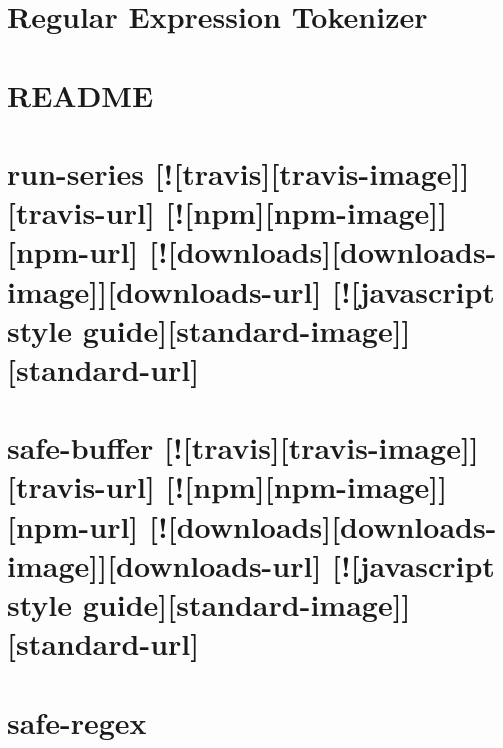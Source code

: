 \documentclass[twoside]{book}
\newcommand{\+}{\discretionary{\mbox{\scriptsize$\hookleftarrow$}}{}{}}
\begin{document}
\chapter{Regular Expression Tokenizer}
\label{md_dsmacc_vis_degree_node_modules_ret_README}

\chapter{R\+E\+A\+D\+ME}
\label{md_dsmacc_vis_degree_node_modules_rimraf_README}

\chapter{run-\/series \mbox{[}!\mbox{[}travis\mbox{]}\mbox{[}travis-\/image\mbox{]}\mbox{]}\mbox{[}travis-\/url\mbox{]} \mbox{[}!\mbox{[}npm\mbox{]}\mbox{[}npm-\/image\mbox{]}\mbox{]}\mbox{[}npm-\/url\mbox{]} \mbox{[}!\mbox{[}downloads\mbox{]}\mbox{[}downloads-\/image\mbox{]}\mbox{]}\mbox{[}downloads-\/url\mbox{]} \mbox{[}!\mbox{[}javascript style guide\mbox{]}\mbox{[}standard-\/image\mbox{]}\mbox{]}\mbox{[}standard-\/url\mbox{]}}
\label{md_dsmacc_vis_degree_node_modules_run-series_README}

\chapter{safe-\/buffer \mbox{[}!\mbox{[}travis\mbox{]}\mbox{[}travis-\/image\mbox{]}\mbox{]}\mbox{[}travis-\/url\mbox{]} \mbox{[}!\mbox{[}npm\mbox{]}\mbox{[}npm-\/image\mbox{]}\mbox{]}\mbox{[}npm-\/url\mbox{]} \mbox{[}!\mbox{[}downloads\mbox{]}\mbox{[}downloads-\/image\mbox{]}\mbox{]}\mbox{[}downloads-\/url\mbox{]} \mbox{[}!\mbox{[}javascript style guide\mbox{]}\mbox{[}standard-\/image\mbox{]}\mbox{]}\mbox{[}standard-\/url\mbox{]}}
\label{md_dsmacc_vis_degree_node_modules_safe-buffer_README}

\chapter{safe-\/regex}
\label{md_dsmacc_vis_degree_node_modules_safe-regex_readme}

\end{document}
